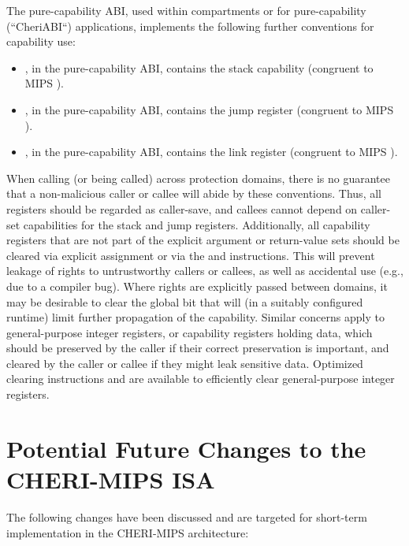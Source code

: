 \noindent
The pure-capability ABI, used within compartments or for pure-capability
(``CheriABI``) applications, implements the following further conventions for
capability use:

\begin{itemize}
\item {}, in the pure-capability ABI, contains the stack capability
  (congruent to MIPS ).
\item {}, in the pure-capability ABI, contains the jump register
  (congruent to MIPS ).
\item {}, in the pure-capability ABI, contains the link register
  (congruent to MIPS ).
\end{itemize}

When calling (or being called) across protection domains, there is no
guarantee that a non-malicious caller or callee will abide by these
conventions.
Thus, all registers should be regarded as caller-save, and callees cannot
depend on caller-set capabilities for the stack and jump registers.
Additionally, all capability registers that are not part of the explicit
argument or return-value sets should be cleared via explicit assignment or
via the  and  instructions.
This will prevent leakage of rights to untrustworthy callers or callees, as
well as accidental use (e.g., due to a compiler bug).
Where rights are explicitly passed between domains, it may be desirable to
clear the global bit that will (in a suitably configured runtime) limit
further propagation of the capability.
Similar concerns apply to general-purpose integer registers, or capability registers
holding data, which should be preserved by the caller if their correct
preservation is important, and cleared by the caller or callee if they might
leak sensitive data.
Optimized clearing instructions  and  are
available to efficiently clear general-purpose integer registers.


\section{Potential Future Changes to the CHERI-MIPS ISA}

The following changes have been discussed and are targeted for short-term
implementation in the CHERI-MIPS architecture:


